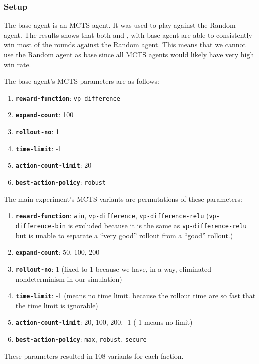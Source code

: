\subsubsection{Setup}
The base agent is an MCTS agent. It was used to play against the Random agent. The results shows that both \Marquise{} and \Eyrie{}, with base agent are able to consistently win most of the rounds against the Random agent. This means that we cannot use the Random agent as base since all MCTS agents would likely have very high win rate.

The base agent's MCTS parameters are as follows:
\begin{enumerate}
    \item \textbf{\texttt{reward-function}}: \texttt{vp-difference}
    \item \textbf{\texttt{expand-count}}: 100
    \item \textbf{\texttt{rollout-no}}: 1
    \item \textbf{\texttt{time-limit}}: -1
    \item \textbf{\texttt{action-count-limit}}: 20
    \item \textbf{\texttt{best-action-policy}}: \texttt{robust}
\end{enumerate}

The main experiment's MCTS variants are permutations of these parameters:
\begin{enumerate}
    \item \textbf{\texttt{reward-function}}: \texttt{win}, \texttt{vp-difference}, \texttt{vp-difference-relu} (\texttt{vp-difference-bin} is excluded because it is the same as \texttt{vp-difference-relu} but is unable to separate a ``very good'' rollout from a ``good'' rollout.)
    \item \textbf{\texttt{expand-count}}: 50, 100, 200
    \item \textbf{\texttt{rollout-no}}: 1 (fixed to 1 because we have, in a way, eliminated nondeterminism in our simulation)
    \item \textbf{\texttt{time-limit}}: -1 (means no time limit. because the rollout time are so fast that the time limit is ignorable)
    \item \textbf{\texttt{action-count-limit}}: 20, 100, 200, -1 (-1 means no limit)
    \item \textbf{\texttt{best-action-policy}}: \texttt{max}, \texttt{robust}, \texttt{secure}
\end{enumerate}
These parameters resulted in 108 variants for each faction.

